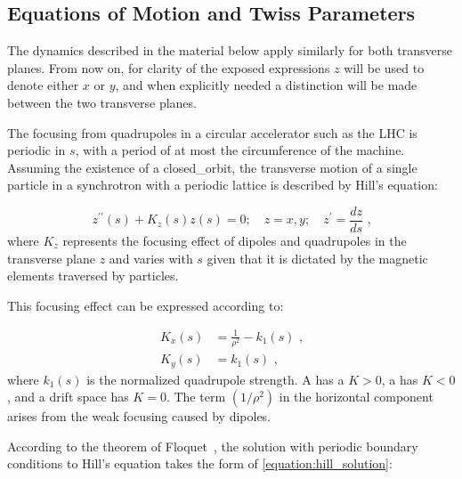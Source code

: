 \subsection{Equations of Motion and Twiss Parameters}
\label{subsection:equations_of_motion_and_twiss_parameters}

\begin{noteblock}
    The dynamics described in the material below apply similarly for both transverse planes.
    From now on, for clarity of the exposed expressions \(z\) will be used to denote either \(x\) or \(y\), and when explicitly needed a distinction will be made between the two transverse planes.
\end{noteblock}

The focusing from quadrupoles in a circular accelerator such as the \gls{LHC} is periodic in \(s\), with a period of at most the circumference of the machine.
Assuming the existence of a \gls{closed_orbit}, the transverse motion of a single particle in a synchrotron with a periodic lattice is described by Hill's equation:

\begin{equation}
    z^{\prime \prime}(s) + K_z(s) z(s) = 0; \quad z = x, y; \quad z^{\prime} = \dfrac{dz}{ds} \text{ ,}
    \label{equation:hill_equation}
\end{equation}
where \(K_z\) represents the focusing effect of dipoles and quadrupoles in the transverse plane \(z\) and varies with \(s\) given that it is dictated by the magnetic elements traversed by particles.

\noindent
This focusing effect can be expressed according to:

\begin{equation}
	\begin{aligned}
		K_x(s) &= \frac{1}{\rho^2} - k_1(s) \text{ ,} \\
    	K_y(s) &= k_1(s) \text{ ,}
	\end{aligned}
    \label{equation:transverse_focusing_strengths}
\end{equation}
where \(k_1(s)\) is the normalized quadrupole strength.
A  has a \(K > 0\), a  has \(K < 0\), and a drift space has \(K = 0\).
The term \(\left(1 / \rho^2\right)\) in the horizontal component arises from the weak focusing caused by dipoles.

According to the theorem of Floquet~\cite{BOOK:Lee:Accelerator_physics}, the solution with periodic boundary conditions to Hill’s equation takes the form of \cref{equation:hill_solution}:

